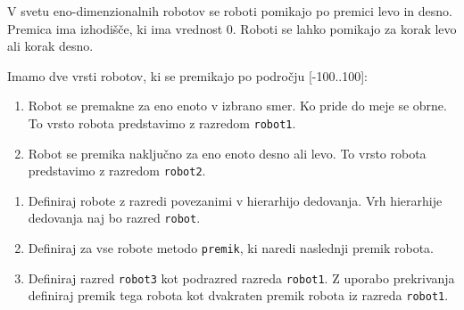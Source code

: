 \begin{ex}
V svetu eno-dimenzionalnih robotov se roboti pomikajo po premici levo in desno. Premica ima izhodi\v s\v ce, ki ima vrednost 0. Roboti se lahko pomikajo za korak levo ali korak desno. 

Imamo dve vrsti robotov, ki se premikajo po podro\v cju [-100..100]:

\begin{enumerate}
\item Robot se premakne za eno enoto v izbrano smer. Ko pride do meje se obrne. To vrsto robota predstavimo z razredom \lstinline{robot1}.

\item Robot se premika naklju\v cno za eno enoto desno ali levo. To vrsto robota predstavimo z razredom \lstinline{robot2}.
\end{enumerate}

\begin{enumerate}[label=(\roman*)]
\item Definiraj robote z razredi povezanimi v hierarhijo dedovanja. Vrh hierarhije dedovanja naj bo razred \lstinline{robot}.

\item Definiraj za vse robote metodo \lstinline{premik}, ki naredi naslednji premik robota.

\item Definiraj razred \lstinline{robot3} kot podrazred razreda \lstinline{robot1}. Z uporabo prekrivanja definiraj premik tega robota kot dvakraten premik robota iz razreda \lstinline{robot1}.
\end{enumerate}
\end{ex} 




%
%



